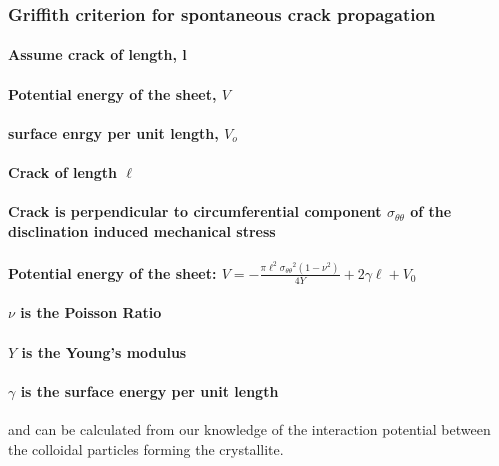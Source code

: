 \documentclass{umthesis}
\begin{document}
\subsubsection{Griffith criterion for spontaneous crack propagation}
\label{sec-2.1.5.2}
\paragraph{Assume crack of length, l}
\label{sec-2.1.5.2.1}
\paragraph{Potential energy of the sheet, $V$}
\label{sec-2.1.5.2.2}
\paragraph{surface enrgy per unit length, $V_o$}
\label{sec-2.1.5.2.3}
\paragraph{Crack of length $\ell$}
\label{sec-2.1.5.2.4}
\paragraph{Crack is perpendicular to circumferential component $\sigma_{\theta \theta}$ of the disclination induced mechanical stress}
\label{sec-2.1.5.2.5}
\paragraph{Potential energy of the sheet: $V =-\frac{\pi \ell^2 {\sigma_{\theta \theta}}^2 (1-\nu^2)}{4 Y} + 2 \gamma \ell + V_0$}
\label{sec-2.1.5.2.6}
\paragraph{$\nu$ is the Poisson Ratio}
\label{sec-2.1.5.2.7}
\paragraph{$Y$ is the Young's modulus}
\label{sec-2.1.5.2.8}
\paragraph{$\gamma$ is the surface energy per unit length}
\label{sec-2.1.5.2.9}

and can be calculated from our knowledge of the interaction potential between the colloidal particles forming the crystallite.
\end{document}

